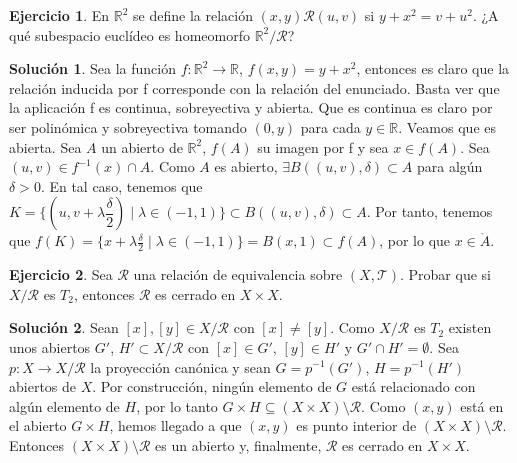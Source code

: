 \documentclass{article}
\theoremstyle{plain}
\theoremstyle{definition}
\newtheorem{exercise}{Ejercicio}
\newtheorem*{sol*}{Solución}
\newcommand{\R}{\mathbb{R}}
\begin{document}
\newpage
\begin{exercise}
En $\mathbb{R}^2$ se define la relación $(x,y) \mathcal{R} (u,v)$ si $y+x^2 = v+u^2$. ¿A qué subespacio euclídeo es homeomorfo $\mathbb{R}^2/\mathcal{R}$?
\end{exercise}
\begin{sol*}
Sea la función $f: \R^2 \to \R$, $f(x,y)=y+x^2$, entonces es claro que la relación inducida por f corresponde con la relación del enunciado. Basta ver que la aplicación f es continua, sobreyectiva y abierta. Que es continua es claro por ser polinómica y sobreyectiva tomando $(0,y)$ para cada $y\in\R$. 
\newline
Veamos que es abierta. Sea $A$ un abierto de $\R^2$, $f(A)$ su imagen por f y sea $x\in f(A)$. Sea $(u,v)\in f^{-1}(x)\cap A$. Como $A$ es abierto, $\exists B((u,v),\delta)\subset A$ para algún $\delta>0$. En tal caso, tenemos que $K=\{(u,v+\lambda \dfrac{\delta}{2}) \mid \lambda \in (-1,1)\}\subset B((u,v),\delta) \subset A$. Por tanto, tenemos que $f(K) = \{x+\lambda\frac{\delta}{2} \mid \lambda \in (-1,1)\} = B(x,1) \subset f(A)$, por lo que $x\in \mathring{A}$.
\end{sol*}

\newpage
\begin{exercise}
Sea $\mathcal{R}$ una relación de equivalencia sobre $(X, \mathcal{T})$. Probar que si $X/\mathcal{R}$ es $T_2$, entonces $\mathcal{R}$ es cerrado en $X \times X$.
\end{exercise}
\begin{sol*}
Sean $[x],[y] \in X/\mathcal{R}$ con $[x] \neq [y]$. Como $X/\mathcal{R}$ es $T_2$ existen unos abiertos $G'$, $H' \subset X/\mathcal{R}$ con $[x] \in G'$, $[y] \in H'$ y $G' \cap H' = \emptyset$. Sea $p : X \to X/\mathcal{R}$ la proyección canónica y sean $G = p^{-1}(G')$, $H = p^{-1}(H')$ abiertos de $X$. Por construcción, ningún elemento de $G$ está relacionado con algún elemento de $H$, por lo tanto $G \times H \subseteq (X \times X) \setminus \mathcal{R}$. Como $(x,y)$ está en el abierto $G \times H$, hemos llegado a que $(x,y)$ es punto interior de $(X \times X) \setminus \mathcal{R}$. Entonces $(X\times X) \setminus \mathcal{R}$ es un abierto y, finalmente, $\mathcal{R}$ es cerrado en $X \times X$.
\end{sol*}
\end{document}
